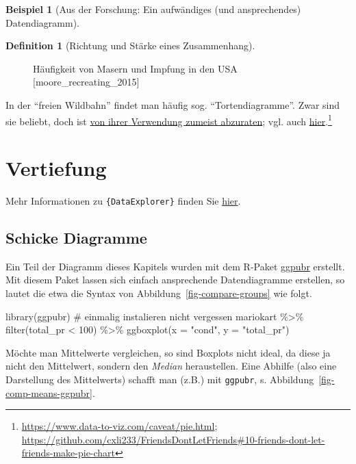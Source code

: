 \documentclass[
  a4paper,
]{scrbook}
\newenvironment{Shaded}{\begin{snugshade}}{\end{snugshade}}
\newcommand{\AttributeTok}[1]{\textcolor[rgb]{0.40,0.45,0.13}{#1}}
\newcommand{\CommentTok}[1]{\textcolor[rgb]{0.37,0.37,0.37}{#1}}
\newcommand{\DecValTok}[1]{\textcolor[rgb]{0.68,0.00,0.00}{#1}}
\newcommand{\FunctionTok}[1]{\textcolor[rgb]{0.28,0.35,0.67}{#1}}
\newcommand{\NormalTok}[1]{\textcolor[rgb]{0.00,0.23,0.31}{#1}}
\newcommand{\SpecialCharTok}[1]{\textcolor[rgb]{0.37,0.37,0.37}{#1}}
\newcommand{\StringTok}[1]{\textcolor[rgb]{0.13,0.47,0.30}{#1}}
\theoremstyle{definition}
\newtheorem{example}{Beispiel}[chapter]
\theoremstyle{definition}
\newtheorem{definition}{Definition}[chapter]
\theoremstyle{definition}
\theoremstyle{remark}
\begin{document}
\begin{example}[Aus der Forschung: Ein aufwändiges (und ansprechendes)
Datendiagramm]
\begin{definition}[Richtung und Stärke eines
Zusammenhang]
\begin{figure}
{}

\caption{\label{fig-vaccine}Häufigkeit von Masern und Impfung in den USA
{[}moore\_recreating\_2015{]}}

\end{figure}%

In der ``freien Wildbahn'' findet man häufig sog. ``Tortendiagramme''.
Zwar sind sie beliebt, doch ist
\href{https://www.data-to-viz.com/caveat/pie.html}{von ihrer Verwendung
zumeist abzuraten}; vgl. auch
\href{https://github.com/cxli233/FriendsDontLetFriends\#10-friends-dont-let-friends-make-pie-chart}{hier}.\footnote{\url{https://www.data-to-viz.com/caveat/pie.html};
  \url{https://github.com/cxli233/FriendsDontLetFriends\#10-friends-dont-let-friends-make-pie-chart}}

\section{Vertiefung}\label{vertiefung-4}

Mehr Informationen zu \texttt{\{DataExplorer\}} finden Sie
\href{https://boxuancui.github.io/DataExplorer/index.html}{hier}.

\subsection{Schicke Diagramme}\label{schicke-diagramme}

Ein Teil der Diagramm dieses Kapitels wurden mit dem R-Paket
\href{https://rpkgs.datanovia.com/ggpubr/}{ggpubr} erstellt. Mit diesem
Paket lassen sich einfach ansprechende Datendiagramme erstellen, so
lautet die etwa die Syntax von Abbildung~\ref{fig-compare-groups} wie
folgt.

\begin{Shaded}
\begin{Highlighting}[]
\FunctionTok{library}\NormalTok{(ggpubr)  }\CommentTok{\# einmalig instalieren nicht vergessen}
\NormalTok{mariokart }\SpecialCharTok{\%\textgreater{}\%} 
  \FunctionTok{filter}\NormalTok{(total\_pr }\SpecialCharTok{\textless{}} \DecValTok{100}\NormalTok{) }\SpecialCharTok{\%\textgreater{}\%} 
  \FunctionTok{ggboxplot}\NormalTok{(}\AttributeTok{x =} \StringTok{"cond"}\NormalTok{, }\AttributeTok{y =} \StringTok{"total\_pr"}\NormalTok{)}
\end{Highlighting}
\end{Shaded}

Möchte man Mittelwerte vergleichen, so sind Boxplots nicht ideal, da
diese ja nicht den Mittelwert, sondern den \emph{Median} heraustellen.
Eine Abhilfe (also eine Darstellung des Mittelwerts) schafft man (z.B.)
mit \texttt{ggpubr}, s. Abbildung~\ref{fig-comp-means-ggpubr}.


\end{definition}
\end{example}
\end{document}
